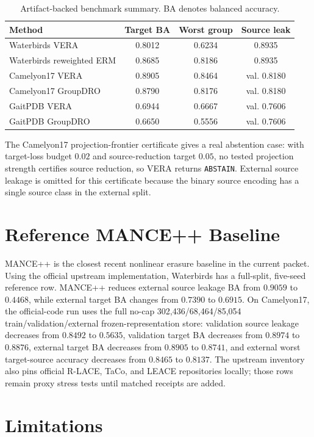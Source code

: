 \documentclass[letterpaper]{article}
\begin{document}
\begin{table}[t]
\centering
\caption{Artifact-backed benchmark summary. BA denotes balanced accuracy.}
\label{tab:main}
\begin{tabular}{@{}lccc@{}}
\toprule
Method & Target BA & Worst group & Source leak \\
\midrule
Waterbirds VERA & 0.8012 & 0.6234 & 0.8935 \\
Waterbirds reweighted ERM & 0.8685 & 0.8186 & 0.8935 \\
Camelyon17 VERA & 0.8905 & 0.8464 & val. 0.8180 \\
Camelyon17 GroupDRO & 0.8790 & 0.8176 & val. 0.8180 \\
GaitPDB VERA & 0.6944 & 0.6667 & val. 0.7606 \\
GaitPDB GroupDRO & 0.6650 & 0.5556 & val. 0.7606 \\
\bottomrule
\end{tabular}
\end{table}

The Camelyon17 projection-frontier certificate gives a real abstention case:
with target-loss budget $0.02$ and source-reduction target $0.05$, no tested
projection strength certifies source reduction, so VERA returns
\texttt{ABSTAIN}. External source leakage is omitted for this certificate
because the binary source encoding has a single source class in the external
split.

\section{Reference MANCE++ Baseline}

MANCE++ is the closest recent nonlinear erasure baseline in the current packet.
Using the official upstream implementation, Waterbirds has a full-split,
five-seed reference row. MANCE++ reduces external source leakage BA from
$0.9059$ to $0.4468$, while external target BA changes from $0.7390$ to
$0.6915$. On Camelyon17, the official-code run uses the full no-cap
302,436/68,464/85,054 train/validation/external frozen-representation store:
validation source leakage decreases from $0.8492$ to $0.5635$, validation
target BA decreases from $0.8974$ to $0.8876$, external target BA decreases
from $0.8905$ to $0.8741$, and external worst target-source accuracy decreases
from $0.8465$ to $0.8137$. The upstream inventory also pins official R-LACE,
TaCo, and LEACE repositories locally; those rows remain proxy stress tests
until matched receipts are added.

\section{Limitations}
\end{document}
